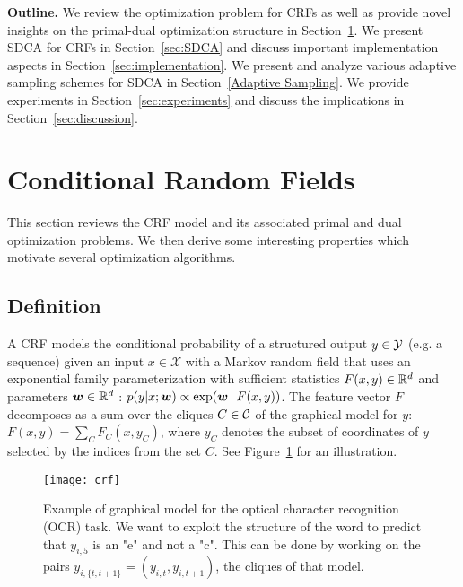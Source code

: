 \textbf{Outline.}
We review the optimization problem for CRFs as well as provide novel insights on the primal-dual optimization structure in Section~\ref{sec:CRF}.
We present SDCA for CRFs in Section~\ref{sec:SDCA} and discuss important implementation aspects in Section~\ref{sec:implementation}.
We present and analyze various adaptive sampling schemes for SDCA in Section~\ref{Adaptive Sampling}.
We provide experiments in Section~\ref{sec:experiments} and discuss the implications in Section~\ref{sec:discussion}.


\section{Conditional Random Fields} \label{sec:CRF}
This section reviews the CRF model and its associated primal and dual optimization problems.
We then derive some interesting properties which motivate several optimization algorithms.

\subsection{Definition}
A CRF models the conditional probability of a structured output $y \in {\mathcal Y}$ (e.g. a sequence) given an input $x\in \mathcal X$ with a Markov random field that uses an exponential family parameterization with sufficient statistics $F(x,y) \in \mathbb{R}^d$ and parameters $\boldsymbol{w} \in \mathbb{R}^d$ : $p(y | x ; \boldsymbol{w}) \propto \exp(\boldsymbol{w}^{\top}F(x, y))$. The feature vector $F$ decomposes as a sum over the cliques $C \in {\mathcal C}$ of the graphical model for $y$: $F(x, y) = \sum_C F_C(x, y_C)$, where $y_C$ denotes the subset of coordinates of $y$ selected by the indices from the set $C$. See Figure~\ref{crf example} for an illustration.


\begin{figure}
	\centering
	\texttt{[image: crf]}
	\caption[Example of graphical model for the optical character recognition (OCR) task]{
		Example of graphical model for the optical character recognition (OCR) task.
		We want to exploit the structure of the word to predict that $y_{i,5}$ is an "e" and not a "c".
		This can be done by working on the pairs $y_{i,\{t, t+1\} } = (y_{i, t}, y_{i, t+1})$, the cliques of that model.
	}
	\label{crf example}
\end{figure}

